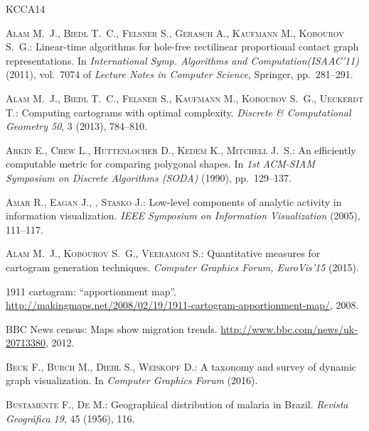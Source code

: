 \documentclass{egpubl}
\begin{document}
\newcommand{\etalchar}[1]{}
\begin{thebibliography}{\uppercase{KCCA{\etalchar{*}}14}}

\bibitem[ABF{\etalchar{*}}11]{ourISAAC}
\textsc{Alam M.~J., Biedl T.~C., Felsner S., Gerasch A., Kaufmann M., Kobourov
  S.~G.}:
\newblock Linear-time algorithms for hole-free rectilinear proportional contact
  graph representations.
\newblock In \emph{International Symp. Algorithms and Computation(ISAAC'11)}
  (2011), vol.~7074 of \emph{Lecture Notes in Computer Science}, Springer,
  pp.~281--291.

\bibitem[ABF{\etalchar{*}}13]{ourSoCG}
\textsc{Alam M.~J., Biedl T.~C., Felsner S., Kaufmann M., Kobourov S.~G.,
  Ueckerdt T.}:
\newblock Computing cartograms with optimal complexity.
\newblock \emph{Discrete \& Computational Geometry 50}, 3 (2013), 784--810.

\bibitem[ACH{\etalchar{*}}90]{ACH91}
\textsc{Arkin E., Chew L., Huttenlocher D., Kedem K., Mitchell J.~S.}:
\newblock An efficiently computable metric for comparing polygonal shapes.
\newblock In \emph{1st ACM-SIAM Symposium on Discrete Algorithms (SODA)}
  (1990), pp.~129--137.

\textsc{Amar R., Eagan J., , Stasko J.}:
\newblock Low-level components of analytic activity in information
  visualization.
\newblock \emph{IEEE Symposium on Information Visualization} (2005), 111--117.

\textsc{Alam M.~J., Kobourov S.~G., Veeramoni S.}:
\newblock Quantitative measures for cartogram generation techniques.
\newblock \emph{Computer Graphics Forum, EuroVis'15} (2015).

1911 cartogram: ``apportionment map''.
\newblock
  \url{http://makingmaps.net/2008/02/19/1911-cartogram-apportionment-map/},
  2008.

{BBC News} census: Maps show migration trends.
\newblock \url{http://www.bbc.com/news/uk-20713380}, 2012.

\textsc{Beck F., Burch M., Diehl S., Weiskopf D.}:
\newblock A taxonomy and survey of dynamic graph visualization.
\newblock In \emph{Computer Graphics Forum} (2016).

\textsc{Bustamente F., De M.}:
\newblock Geographical distribution of malaria in {Brazil}.
\newblock \emph{Revista Geogr{\'a}fica 19}, 45 (1956), 116.


\end{thebibliography}
\end{document}
